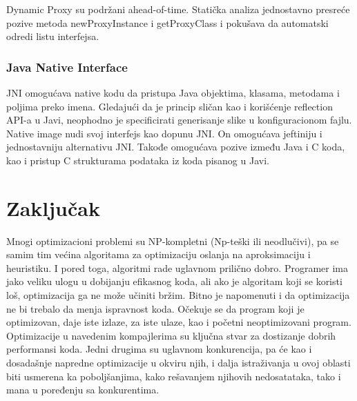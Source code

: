 \documentclass[a4paper]{article}
\begin{document}
Dynamic Proxy su podržani ahead-of-time. Statička analiza 
jednostavno presreće pozive metoda newProxyInstance i 
getProxyClass i pokušava da automatski odredi listu interfejsa.

\subsubsection{Java Native Interface}
\label{sec:natImg-jni}
JNI omogućava native kodu da pristupa Java objektima, klasama,
metodama i poljima preko imena. Gledajući da je princip sličan
kao i korišćenje reflection API-a u Javi, neophodno je specificirati
generisanje slike u konfiguracionom fajlu.
Native image nudi svoj interfejs kao dopunu JNI.
On omogućava jeftiniju i jednostavniju alternativu JNI. Takođe
omogućava pozive između Java i C koda, kao i pristup C strukturama
podataka iz koda pisanog u Javi.



\section{Zaključak}
\label{sec:zakljucak}

Mnogi optimizacioni problemi su NP-kompletni (Np-teški ili neodlučivi), pa se samim tim većina algoritama za optimizaciju oslanja na aproksimaciju i heuristiku.  
I pored toga, algoritmi rade uglavnom prilično dobro. 
Programer ima jako veliku ulogu u dobijanju efikasnog koda, ali ako je algoritam koji se koristi loš, optimizacija ga ne može učiniti bržim. 
Bitno je napomenuti i da optimizacija ne bi trebalo da menja ispravnost koda. 
Očekuje se da program koji je optimizovan, daje iste izlaze, za iste ulaze, kao i početni neoptimizovani program.
Optimizacije u navedenim kompajlerima su ključna stvar za dostizanje dobrih performansi koda. 
Jedni drugima su uglavnom konkurencija, pa će kao i dosadašnje napredne optimizacije u okviru njih, i dalja istraživanja u ovoj 
oblasti biti usmerena ka poboljšanjima, kako rešavanjem njihovih nedosatataka, tako i mana u poređenju sa konkurentima.


\appendix
 

\end{document}
